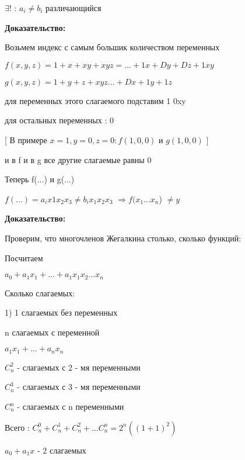 \documentclass[russian]{lecture-notes}
\begin{document}
\begin{sloppypar}
\begin{proposition}
\begin{definition}
            $\exists!$ : $a_{i} \neq b_{i}$ различающийся
            
        \end{definition}
        
        \qquad \textbf{Доказательство:}
        
        Возьмем индекс с самым большик количеством переменных
        
        $f(x,y,z) = 1 + x + xy + xyz = ... + 1x + Dy + Dz + 1xy$
        
        $g(x,y,z) = 1 + y + z + xyz ... + Dx + 1y + 1z$
        
        для переменных этого слагаемого подставим 1 0xy 
        
        для остальных переменных : 0
        
        [ В примере $x=1,y=0,z=0 : f(1,0,0)$ и $g(1,0,0)$ ]
        
        и в f и в g все другие слагаемые равны 0
        
            Теперь f(...) и g(...) 
            
                $f(...) = a_{i}x{1}x_{2}x_{3} \neq b_{i}x_{1}x_{2}x_{3}$ $\Rightarrow f(x_{1}...x_{n}$) $\neq y$ 
                
    \qquad \textbf{Доказательство:}
    
    Проверим, что многочленов Жегалкина столько, сколько функций:
    
        Посчитаем
        
        $a_{0} + a_{1}x_{1}+ ... + a_{1}x_{1}x_{2}...x_{n}$
        
        Сколько слагаемых:
        
        1) 1 слагаемых без переменных
        
        n слагаемых с переменной
        
        \qquad $a_{1}x_{1} + ... + a_{n}x_{n}$
        
        $C_{n}^{2}$ - слагаемых с 2 - мя переменными
        
        $C_{n}^{3}$ - слагаемых с 3 - мя переменными
        
        $C_{n}^{n}$ - слагаемых с n переменными
        
        Всего : $ C_{n}^{0} + C_{n}^{1} + C_{n}^{2} + ... C_{n}^{n} = 2^{n}((1+1)^{2}) $
        
    \begin{example}
            
    $a_{0} + a_{1}x$ - 2 слагаемых
            

\end{example}
\end{proposition}
\end{sloppypar}
\end{document}
